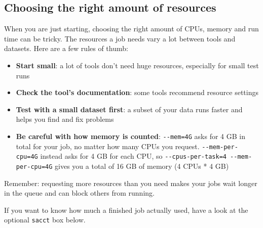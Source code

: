 \documentclass[
  letterpaper,
  DIV=11,
  numbers=noendperiod]{scrreprt}
\providecommand{\tightlist}{%
  \setlength{\itemsep}{0pt}\setlength{\parskip}{0pt}}
\begin{document}
\subsection{Choosing the right amount of
resources}\label{choosing-the-right-amount-of-resources}

When you are just starting, choosing the right amount of CPUs, memory
and run time can be tricky. The resources a job needs vary a lot between
tools and datasets. Here are a few rules of thumb:

\begin{itemize}
\tightlist
\item
  \textbf{Start small}: a lot of tools don't need huge resources,
  especially for small test runs
\item
  \textbf{Check the tool's documentation}: some tools recommend resource
  settings
\item
  \textbf{Test with a small dataset first}: a subset of your data runs
  faster and helps you find and fix problems
\item
  \textbf{Be careful with how memory is counted}: \texttt{-\/-mem=4G}
  asks for 4 GB in total for your job, no matter how many CPUs you
  request. \texttt{-\/-mem-per-cpu=4G} instead asks for 4 GB for each
  CPU, so \texttt{-\/-cpus-per-task=4\ -\/-mem-per-cpu=4G} gives you a
  total of 16 GB of memory (4 CPUs * 4 GB)
\end{itemize}

Remember: requesting more resources than you need makes your jobs wait
longer in the queue and can block others from running.

If you want to know how much a finished job actually used, have a look
at the optional \texttt{sacct} box below.
\end{document}
